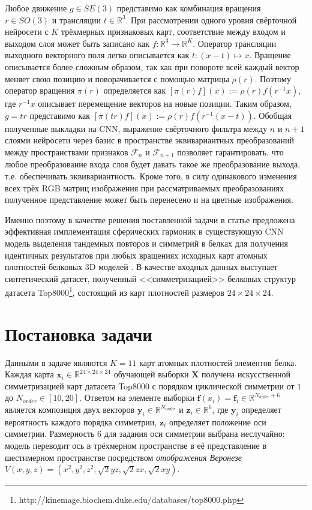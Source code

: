 \documentclass[12pt,twosides]{article}
\begin{document}
	Любое движение $g\in SE(3)$ представимо как комбинация вращения $r\in SO(3)$ и трансляции $t\in\mathbb{R}^3$. При рассмотрении одного уровня свёрточной нейросети с $K$ трёхмерных признаковых карт, соответствие между входом и выходом слоя может быть записано как $f:\mathbb{R}^3\rightarrow\mathbb{R}^K$. Оператор трансляции выходного векторного поля легко описывается как $t:(x-t)\mapsto x$. Вращение описывается более сложным образом, так как при повороте всей каждый вектор меняет свою позицию и поворачивается с помощью матрицы $\rho(r)$. Поэтому оператор вращения $\pi(r)$ определяется как $[\pi(r)f](x):=\rho(r)f(r^{-1}x)$, где $r^{-1}x$ описывает перемещение векторов на новые позиции. Таким образом, $g=tr$ представимо как $[\pi(tr)f](x):=\rho(r)f(r^{-1}(x-t))$. Обобщая полученные выкладки на CNN, выражение свёрточного фильтра между $n$ и $n+1$ слоями нейросети через базис в пространстве эквивариантных преобразований между пространствами признаков $\mathcal{F}_n$ и $\mathcal{F}_{n+1}$ позволяет гарантировать, что любое преобразование входа слоя будет давать такое же преобразование выхода, т.е. обеспечивать эквивариантность. Кроме того, в силу одинакового изменения всех трёх RGB матриц изображения при рассматриваемых преобразованиях полученное представление может быть перенесено и на цветные изображения.
	
	Именно поэтому в качестве решения поставленной задачи в статье предложена эффективная имплементация сферических гармоник в существующую CNN модель выделения тандемных повторов и симметрий в белках для получения идентичных результатов при любых вращениях исходных карт атомных плотностей белковых 3D моделей \cite{DeepSymmetry18}. В качестве входных данных выступает синтетический датасет, полученный <<симметризацией>> белковых структур датасета Top8000\footnote{ http://kinemage.biochem.duke.edu/databases/top8000.php}, состоящий из карт плотностей размеров $24\times24\times24$. 
	 
	\section{Постановка задачи}
	Данными в задаче являются $K=11$ карт атомных плотностей элементов белка. Каждая карта $\mathbf{x}_i\in\mathbb{R}^{24\times24\times24}$ обучающей выборки $\mathbf{X}$ получена искусственной симметризацией карт датасета Top8000 с порядком циклической симметрии от $1$ до $N_{order}\in[10,20]$.
	Ответом на элементе выборки $\mathbf{f}(x_i)=\mathbf{f}_i\in\mathbb{R}^{N_{order}+6}$ является композиция двух векторов $\mathbf{y}_i\in\mathbb{R}^{N_{order}}$ и $\mathbf{z}_i\in\mathbb{R}^6$, где $\mathbf{y}_i$  определяет вероятность каждого порядка симметрии, $\mathbf{z}_i$ определяет положение оси симметрии. Размерность 6 для задания оси симметрии выбрана неслучайно: модель переводит ось в трёхмерном пространстве в её представление в шестимерном пространстве посредством \textit{отображения Веронезе} $V(x,y,z)=(x^2,y^2,z^2,\sqrt2yz,\sqrt2zx,\sqrt2xy)$. 
	 
\end{document}
